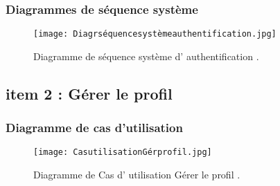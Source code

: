 \subsubsection{Diagrammes de séquence système }
\begin{figure}[ht]
	\centering
	\texttt{[image: Diagrséquencesystèmeauthentification.jpg]}
	\caption{Diagramme de séquence système d' authentification .}
	\label{fig:Diagramme de séquence système d' authentification }
\end{figure}
\FloatBarrier

\clearpage

\subsection{item 2 : Gérer le profil}
\subsubsection{Diagramme de cas d’utilisation }


\begin{figure}[ht]
	\centering
	\texttt{[image: CasutilisationGérprofil.jpg]}
	\caption{Diagramme de Cas d' utilisation Gérer le profil .}
	\label{fig:Gérer le profil }
\end{figure}
\FloatBarrier


